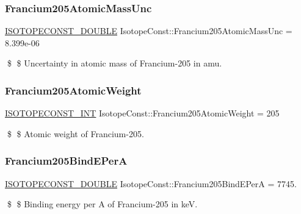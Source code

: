 \subsubsection{\texorpdfstring{Francium205\+Atomic\+Mass\+Unc}{Francium205AtomicMassUnc}}
{\footnotesize\ttfamily \mbox{\hyperlink{group___isotope_const-_macros_ga8f45a7272ce02c0b4c65c44636ed719a}{I\+S\+O\+T\+O\+P\+E\+C\+O\+N\+S\+T\+\_\+\+D\+O\+U\+B\+LE}} Isotope\+Const\+::\+Francium205\+Atomic\+Mass\+Unc = 8.\+399e-\/06}

\$ \$ Uncertainty in atomic mass of Francium-\/205 in amu. \mbox{\label{group___isotope_const-_francium-_fr205_ga151754635cee9ed5035db69d69ef82a7}} 
\subsubsection{\texorpdfstring{Francium205\+Atomic\+Weight}{Francium205AtomicWeight}}
{\footnotesize\ttfamily \mbox{\hyperlink{group___isotope_const-_macros_ga5f18360b3e99483a35c32d789e62621c}{I\+S\+O\+T\+O\+P\+E\+C\+O\+N\+S\+T\+\_\+\+I\+NT}} Isotope\+Const\+::\+Francium205\+Atomic\+Weight = 205}

\$ \$ Atomic weight of Francium-\/205. \mbox{\label{group___isotope_const-_francium-_fr205_ga937a8d8e781a6202ea74bdcb22b7d63d}} 
\subsubsection{\texorpdfstring{Francium205\+Bind\+E\+PerA}{Francium205BindEPerA}}
{\footnotesize\ttfamily \mbox{\hyperlink{group___isotope_const-_macros_ga8f45a7272ce02c0b4c65c44636ed719a}{I\+S\+O\+T\+O\+P\+E\+C\+O\+N\+S\+T\+\_\+\+D\+O\+U\+B\+LE}} Isotope\+Const\+::\+Francium205\+Bind\+E\+PerA = 7745.}

\$ \$ Binding energy per A of Francium-\/205 in keV. \mbox{\label{group___isotope_const-_francium-_fr205_ga26ad95e63226442fd85ab4e99a7100e8}} 
